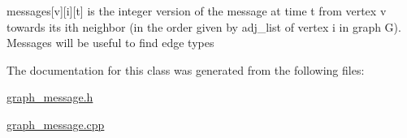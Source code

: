 messages\mbox{[}v\mbox{]}\mbox{[}i\mbox{]}\mbox{[}t\mbox{]} is the integer version of the message at time t from vertex v towards its ith neighbor (in the order given by adj\+\_\+list of vertex i in graph G). Messages will be useful to find edge types 



The documentation for this class was generated from the following files\+:\begin{DoxyCompactItemize}
\item 
\hyperlink{graph__message_8h}{graph\+\_\+message.\+h}\item 
\hyperlink{graph__message_8cpp}{graph\+\_\+message.\+cpp}\end{DoxyCompactItemize}

